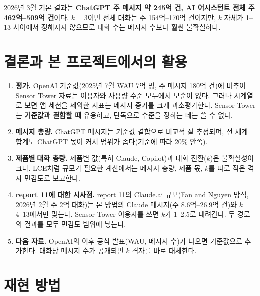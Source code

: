 \documentclass[11pt]{article}
\begin{document}
2026년 3월 기본 결과는 \textbf{ChatGPT 주 메시지 약 245억 건, AI 어시스턴트 전체 주 462억--509억 건}이다. $k = 3$이면 전체 대화는 주 154억--170억 건이지만, $k$ 자체가 1--13 사이에서 정해지지 않으므로 대화 수는 메시지 수보다 훨씬 불확실하다.

\section{결론과 본 프로젝트에서의 활용}

\begin{enumerate}[label=(\arabic*)]
  \item \textbf{평가.} OpenAI 기준값(2025년 7월 WAU 7억 명, 주 메시지 180억 건)에 비추어 Sensor Tower 자료는 이용자와 사용량 수준 모두에서 모순이 없다. 그러나 시계열로 보면 앱 세션을 제외한 지표는 메시지 증가를 크게 과소평가한다. Sensor Tower는 \textbf{기준값과 결합할 때} 유용하고, 단독으로 수준을 정하는 데는 쓸 수 없다.
  \item \textbf{메시지 총량.} ChatGPT 메시지는 기준값 결합으로 비교적 잘 추정되며, 전 세계 합계도 ChatGPT 몫이 커서 범위가 좁다(기준에 따라 20\% 안쪽).
  \item \textbf{제품별$\cdot$대화 총량.} 제품별 값(특히 Claude, Copilot)과 대화 전환($k$)은 불확실성이 크다. LCE처럼 규모가 필요한 계산에서는 메시지 총량, 제품 몫, $k$를 따로 적은 격자 민감도로 보고한다.
  \item \textbf{report 11에 대한 시사점.} report 11의 Claude.ai 규모(Fan and Nguyen 방식, 2026년 2월 주 2억 대화)는 본 방법의 Claude 메시지(주 8.6억--26.9억 건)와 $k$ = 4--13에서만 맞는다. Sensor Tower 이용자를 쓰면 $k$가 1--2.5로 내려간다. 두 경로의 결과를 모두 민감도 범위에 넣는다.
  \item \textbf{다음 자료.} OpenAI의 이후 공식 발표(WAU, 메시지 수)가 나오면 기준값으로 추가한다. 대화당 메시지 수가 공개되면 $k$ 격자를 바로 대체한다.
\end{enumerate}

\section{재현 방법}
\end{document}
